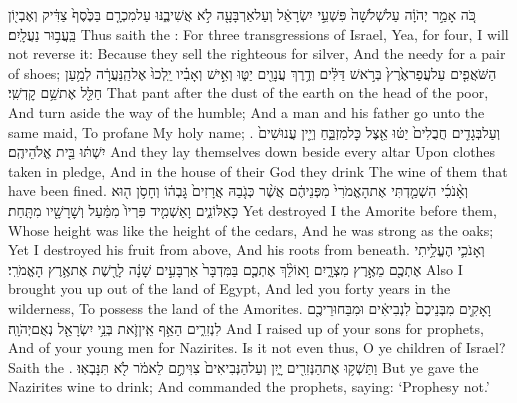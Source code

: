 \label{haft_9}
\setcounter{chap}{2}
\setcounter{verse}{6}
{כֹּ֚ה אָמַ֣ר יְהֹוָ֔ה עַל\maqqaf שְׁלֹשָׁה֙ פִּשְׁעֵ֣י יִשְׂרָאֵ֔ל וְעַל\maqqaf אַרְבָּעָ֖ה לֹ֣א אֲשִׁיבֶ֑נּוּ עַל\maqqaf מִכְרָ֤ם בַּכֶּ֙סֶף֙ צַדִּ֔יק וְאֶבְי֖וֹן בַּֽעֲב֥וּר נַעֲלָֽיִם׃}
{Thus saith the \lord: For three transgressions of Israel, Yea, for four, I will not reverse it: Because they sell the righteous for silver, And the needy for a pair of shoes;}
{הַשֹּׁאֲפִ֤ים עַל\maqqaf עֲפַר\maqqaf אֶ֙רֶץ֙ בְּרֹ֣אשׁ דַּלִּ֔ים וְדֶ֥רֶךְ עֲנָוִ֖ים יַטּ֑וּ וְאִ֣ישׁ וְאָבִ֗יו יֵֽלְכוּ֙ אֶל\maqqaf הַֽנַּעֲרָ֔ה לְמַ֥עַן חַלֵּ֖ל אֶת\maqqaf שֵׁ֥ם קׇדְשִֽׁי׃}
{That pant after the dust of the earth on the head of the poor, And turn aside the way of the humble; And a man and his father go unto the same maid, To profane My holy name; .}
{וְעַל\maqqaf בְּגָדִ֤ים חֲבֻלִים֙ יַטּ֔וּ אֵ֖צֶל כׇּל\maqqaf מִזְבֵּ֑חַ וְיֵ֤ין עֲנוּשִׁים֙ יִשְׁתּ֔וּ בֵּ֖ית אֱלֹהֵיהֶֽם׃}
{And they lay themselves down beside every altar Upon clothes taken in pledge, And in the house of their God they drink The wine of them that have been fined.}
{וְאָ֨נֹכִ֜י הִשְׁמַ֤דְתִּי אֶת\maqqaf הָאֱמֹרִי֙ מִפְּנֵיהֶ֔ם אֲשֶׁ֨ר כְּגֹ֤בַהּ אֲרָזִים֙ גׇּבְה֔וֹ וְחָסֹ֥ן ה֖וּא כָּאַלּוֹנִ֑ים וָאַשְׁמִ֤יד פִּרְיוֹ֙ מִמַּ֔עַל וְשׇׁרָשָׁ֖יו מִתָּֽחַת׃}
{Yet destroyed I the Amorite before them, Whose height was like the height of the cedars, And he was strong as the oaks; Yet I destroyed his fruit from above, And his roots from beneath.}
{וְאָנֹכִ֛י הֶעֱלֵ֥יתִי אֶתְכֶ֖ם מֵאֶ֣רֶץ מִצְרָ֑יִם וָאוֹלֵ֨ךְ אֶתְכֶ֤ם בַּמִּדְבָּר֙ אַרְבָּעִ֣ים שָׁנָ֔ה לָרֶ֖שֶׁת אֶת\maqqaf אֶ֥רֶץ הָאֱמֹרִֽי׃}
{Also I brought you up out of the land of Egypt, And led you forty years in the wilderness, To possess the land of the Amorites.}
{וָאָקִ֤ים מִבְּנֵיכֶם֙ לִנְבִיאִ֔ים וּמִבַּחוּרֵיכֶ֖ם לִנְזִרִ֑ים הַאַ֥ף אֵֽין\maqqaf זֹ֛את בְּנֵ֥י יִשְׂרָאֵ֖ל נְאֻם\maqqaf יְהֹוָֽה׃}
{And I raised up of your sons for prophets, And of your young men for Nazirites. Is it not even thus, O ye children of Israel? Saith the \lord.}
{וַתַּשְׁק֥וּ אֶת\maqqaf הַנְּזִרִ֖ים יָ֑יִן וְעַל\maqqaf הַנְּבִיאִים֙ צִוִּיתֶ֣ם לֵאמֹ֔ר לֹ֖א תִּנָּבְאֽוּ׃}
{But ye gave the Nazirites wine to drink; And commanded the prophets, saying: ‘Prophesy not.’}
